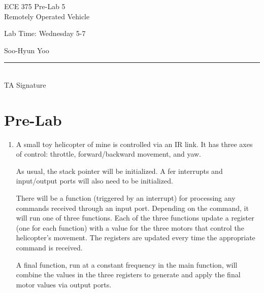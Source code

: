 \documentclass[12pt,letterpaper]{article}
\begin{document}
\begin{titlepage}
    \vspace*{4cm}
    \begin{flushright}
    {\huge
        ECE 375 Pre-Lab 5\\[1cm]
    }
    {\large
        Remotely Operated Vehicle
    }
    \end{flushright}
    \begin{flushleft}
    Lab Time: Wednesday 5-7
    \end{flushleft}
    \begin{flushright}
    Soo-Hyun Yoo

    \vfill
    \rule{5in}{.5mm}\\
    TA Signature
    \end{flushright}

\end{titlepage}

\section*{Pre-Lab}

\begin{enumerate}
	\item A small toy helicopter of mine is controlled via an IR link. It has
		three axes of control: throttle, forward/backward movement, and yaw.

		As usual, the stack pointer will be initialized. A fer interrupts and
		input/output ports will also need to be initialized.

		There will be a function (triggered by an interrupt) for processing any
		commands received through an input port. Depending on the command, it
		will run one of three functions. Each of the three functions update
		a register (one for each function) with a value for the three motors
		that control the helicopter's movement. The registers are updated every
		time the appropriate command is received.

		A final function, run at a constant frequency in the main function,
		will combine the values in the three registers to generate and apply
		the final motor values via output ports.
\end{enumerate}
\end{document}
